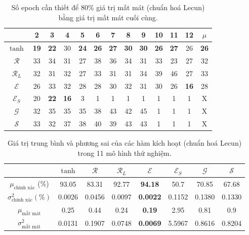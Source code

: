 \begin{table}[ht!]
\centering
\def\arraystretch{1.3}
\begin{tabular}{c|c|c|c|c|c|c|c|c|c|c|c|c|}
\cline{2-13}
                        & 2  & 3  & 4  & 5  & 6  & 7  & 8  & 9  & 10 & 11 & 12 & $\mu$ \\ \hline
\multicolumn{1}{|c|}{$\tanh$} & \textbf{19} & \textbf{22} & 30 & \textbf{24} & \textbf{26} & \textbf{27} & \textbf{30} & \textbf{30} & \textbf{26} & \textbf{27} & 26 & \textbf{26}\\ \hline
\multicolumn{1}{|c|}{$\mathcal{R}$} & 33 & 34 & 31 & 27 & 38 & 36 & 34 & 31 & 33 & 23 & 27 & 32\\ \hline
\multicolumn{1}{|c|}{$\mathcal{R}_L$} & 32 & 31 & 32 & 27 & 33 & 31 & 31 & 34 & 39 & 46 & 27 & 33\\ \hline
\multicolumn{1}{|c|}{$\mathcal{E}$} & 26 & 33 & 32 & 28 & 28 & 30 & 32 & 31 & 30 & 26 & \textbf{16} & 28\\ \hline
\multicolumn{1}{|c|}{$\mathcal{E}_S$} & 20 & \textbf{22} & \textbf{16} & 3  & 1  & 1  & 1  & 1  & 1  & 1  & 1  & X\\ \hline
\multicolumn{1}{|c|}{$\mathcal{G}$} & 32 & 35 & 35 & 35 & 38 & 43 & 42 & 45 & 1  & 1  & 1  & X\\ \hline
\multicolumn{1}{|c|}{$\mathcal{S}$} & 33 & 32 & 37 & 38 & 40 & 39 & 43 & 43 & 1  & 1  & 1  & X\\ \hline
\end{tabular}
\caption{Số epoch cần thiết để 80\% giá trị mất mát (chuẩn hoá Lecun) bằng giá trị mất mát cuối cùng.}
\label{tab:mnistdepoch}
\end{table}

\begin{table}[ht!]
\centering
\def\arraystretch{1.5}
\begin{tabular}{c|c|c|c|c|c|c|c|}
\cline{2-8}
                             & $\tanh$      & $\mathcal{R}$      & $\mathcal{R}_L$      & $\mathcal{E}$      & $\mathcal{E}_S$      & $\mathcal{G}$      & $\mathcal{S}$      \\ \hline
\multicolumn{1}{|c|}{$\mu_{\text{chính xác}}$ (\%)}    & 93.05  & 83.31  & 92.77  & \textbf{94.18}  & 50.7   & 70.85  & 67.68  \\ \hline
\multicolumn{1}{|c|}{$\sigma^2_{\text{chính xác}} (\%)$}  & 0.0026 & 0.0456 & 0.0097 & \textbf{0.0022} & 0.1152 & 0.1380 & 0.1330 \\ \hline
\multicolumn{1}{|c|}{$\mu_{\text{mất mát}}$}   & 0.25   & 0.44   & 0.24   & \textbf{0.19}   & 2.95   & 0.81   & 0.9    \\ \hline
\multicolumn{1}{|c|}{$\sigma^2_{\text{mất mát}}$} & 0.0131 & 0.1907 & 0.0748 & \textbf{0.0069} & 5.5967 & 0.8616 & 0.8204 \\ \hline
\end{tabular}
\caption{Giá trị trung bình và phương sai của các hàm kích hoạt (chuẩn hoá Lecun) trong 11 mô hình thử nghiệm.}
\label{tab:mnistdmean}
\end{table}

